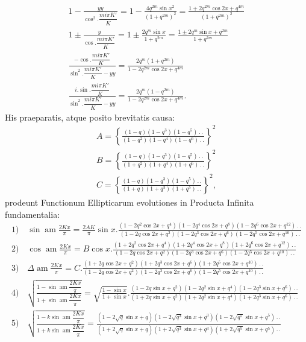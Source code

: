 \documentclass{article}
\begin{document}
\[
\begin{gathered}
1-\frac{yy}{\cos^{2}.\dfrac{mi\pi K'}{K}}=1-\frac{4q^{2m}\sin x^{2}}{(1+q^{2m})^{2}}=\frac{1+2q^{2m}\cos 2x+q^{4m}}{(1+q^{2m})^{2}}
\\[2ex]
1\pm\frac{y}{\cos.\dfrac{mi\pi K'}{K}}=1\pm\frac{2q^{m}\sin x}{1+q^{2m}}=\frac{1\pm 2q^{m}\sin x+q^{2m}}{1+q^{2m}}
\\[2ex]
\frac{-\cos.\dfrac{mi\pi K'}{K}}{\sin^{2}.\dfrac{mi\pi K'}{K}-yy}=\frac{2q^{m}(1+q^{2m})}{1-2q^{2m}\cos 2x+q^{4m}}
\\[2ex]
\frac{i.\sin.\dfrac{mi\pi K'}{K}}{\sin^{2}.\dfrac{mi\pi K'}{K}-yy}=\frac{2q^{m}(1-q^{2m})}{1-2q^{2m}\cos 2x+q^{4m}}.
\end{gathered}
\]
His praeparatis, atque posito brevitatis causa:
\[
\begin{gathered}
A=\left\{\frac{(1-q)(1-q^{3})(1-q^{5})\,.\,.}{(1-q^{2})(1-q^{4})(1-q^{6})\,.\,.}\right\}^{2}
\\[2ex]
B=\left\{\frac{(1-q)(1-q^{3})(1-q^{5})\,.\,.}{(1+q^{2})(1+q^{4})(1+q^{6})\,.\,.}\right\}^{2}
\\[2ex]
C=\left\{\frac{(1-q)(1-q^{3})(1-q^{5})\,.\,.}{(1+q)(1+q^{3})(1+q^{5})\,.\,.}\right\}^{2},
\end{gathered}
\]
prodeunt Functionum Ellipticarum evolutiones in Producta Infinita fundamentalia:
\[
\begin{gathered}
\text{1)}\quad\sin\operatorname{am}\frac{2Kx}{\pi}=\frac{2AK}{\pi}\sin x.\frac{(1-2q^{2}\cos 2x+q^{4})(1-2q^{4}\cos 2x+q^{8})(1-2q^{6}\cos 2x+q^{12})\,.\,.}{(1-2q\cos 2x+q^{2})(1-2q^{3}\cos 2x+q^{6})(1-2q^{5}\cos 2x+q^{10})\,.\,.}
\\[2ex]
\text{2)}\quad\cos\operatorname{am}\frac{2Kx}{\pi}=B\cos x.\frac{(1+2q^{2}\cos 2x+q^{4})(1+2q^{4}\cos 2x+q^{8})(1+2q^{6}\cos 2x+q^{12})\,.\,.}{(1-2q\cos 2x+q^{2})(1-2q^{3}\cos 2x+q^{6})(1-2q^{5}\cos 2x+q^{10})\,.\,.}
\\[2ex]
\text{3)}\quad\Delta\operatorname{am}\frac{2Kx}{\pi}=C.\frac{(1+2q\cos 2x+q^{2})(1+2q^{3}\cos 2x+q^{6})(1+2q^{5}\cos 2x+q^{10})\,.\,.}{(1-2q\cos 2x+q^{2})(1-2q^{3}\cos 2x+q^{6})(1-2q^{5}\cos 2x+q^{10})\,.\,.}
\\[2ex]
\text{4)}\quad\sqrt{\frac{1-\sin\operatorname{am}\dfrac{2Kx}{\pi}}{1+\sin\operatorname{am}\dfrac{2Kx}{\pi}}}=\sqrt{\frac{1-\sin x}{1+\sin x}}.\frac{(1-2q\sin x+q^{2})(1-2q^{2}\sin x+q^{4})(1-2q^{3}\sin x+q^{6})\,.\,.}{(1+2q\sin x+q^{2})(1+2q^{2}\sin x+q^{4})(1+2q^{3}\sin x+q^{6})\,.\,.}
\\[2ex]
\text{5)}\quad\sqrt{\frac{1-k\sin\operatorname{am}\dfrac{2Kx}{\pi}}{1+k\sin\operatorname{am}\dfrac{2Kx}{\pi}}}=\frac{(1-2\sqrt{q}\sin x+q)(1-2\sqrt{q^{3}}\sin x+q^{3})(1-2\sqrt{q^{5}}\sin x+q^{5})\,.\,.}{(1+2\sqrt{q}\sin x+q)(1+2\sqrt{q^{3}}\sin x+q^{3})(1+2\sqrt{q^{5}}\sin x+q^{5})\,.\,.}
\end{gathered}
\]
\end{document}
